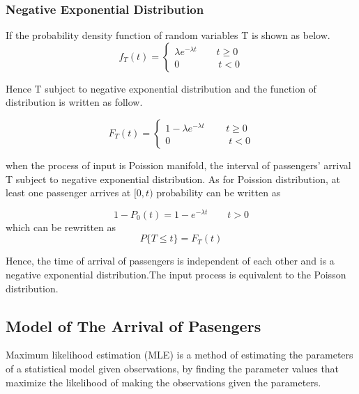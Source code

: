 \documentclass{mcmthesis}
\begin{document}
\subsubsection{Negative Exponential Distribution}
If the probability density function of random variables T is shown as below.
\begin{equation}    
f_T(t)=\left  \{
       \begin{array}{lr}
           \lambda e^{-\lambda t}\qquad t\geqslant 0\\
            0\qquad\qquad t<0
        \end{array}
\right.
\end{equation}


Hence T subject to negative exponential distribution and the function of distribution is written as follow.

\begin{equation}    
F_T(t)=\left  \{
       \begin{array}{lr}
          1- \lambda e^{-\lambda t}\qquad\,  t\geqslant 0\\
            0\qquad\qquad\qquad t<0
        \end{array}
\right.
\end{equation}

when the  process of input is Poission manifold, the interval of passengers' arrival T subject to  negative exponential distribution. As for Poission  distribution, at least one passenger arrives at $[0,t)$  probability can  be written as


\begin{equation}
1-P_0(t)=1-e^{-\lambda t}\qquad t>0
\end{equation}
which can be rewritten as
\begin{equation}
 P\{T\leqslant t \}=F_T(t)
\end{equation}


Hence, the time of arrival of passengers is independent of each other and is a negative exponential distribution.The input process is equivalent to the Poisson distribution.

	\subsection{Model of The Arrival of Pasengers} \label{flag1.1} %
		Maximum likelihood estimation (MLE) is a method of estimating the parameters of a statistical model given observations, by finding the parameter values that maximize the likelihood of making the observations given the parameters. 
\end{document}
